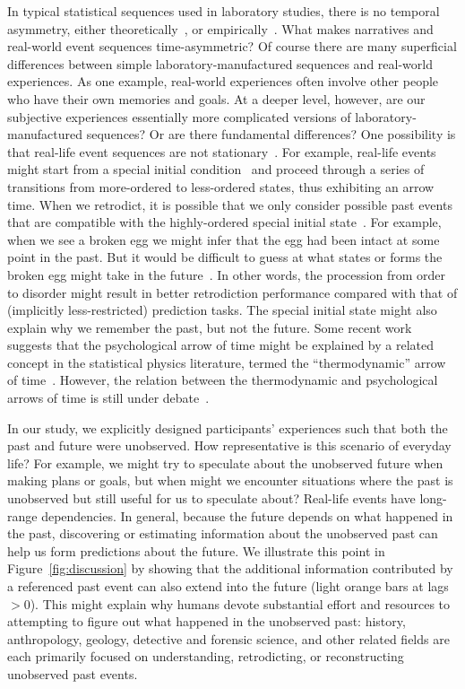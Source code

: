 \documentclass[10pt]{article}
\begin{document}
In typical statistical sequences used in laboratory studies, there is no temporal asymmetry, either theoretically~\citep{Cove94, BialEtal01, ElliEtal09}, or empirically~\citep{JonePash07}. What makes narratives and real-world event sequences time-asymmetric? Of course there are many superficial differences between simple laboratory-manufactured sequences and real-world experiences.  As one example, real-world experiences often involve other people who have their own memories and goals.  At a deeper level, however, are our subjective experiences essentially more complicated versions of laboratory-manufactured sequences?  Or are there fundamental differences?  One possibility is that real-life event sequences are not stationary~\citep[i.e., not in equilibrium,][]{Cove94}. For example, real-life events might start from a special initial condition~\citep{Albe00, Feyn65, Cove94} and proceed through a series of transitions from more-ordered to less-ordered states, thus exhibiting an arrow time. When we retrodict, it is possible that we only consider possible past events that are compatible with the highly-ordered special initial state~\citep{Carr10, Carr16}.  For example, when we see a broken egg we might infer that the egg had been intact at some point in the past.  But it would be difficult to guess at what states or forms the broken egg might take in the future~\citep{Carr10, Carr16}.  In other words, the procession from order to disorder might result in better retrodiction performance compared with that of (implicitly less-restricted) prediction tasks. The special initial state might also explain why we remember the past, but not the future. Some recent work suggests that the psychological arrow of time might be explained by a related concept in the statistical physics literature, termed the ``thermodynamic'' arrow of time~\citep{MlodBrun14, Rove22}. However, the relation between the thermodynamic and psychological arrows of time is still under debate~\citep{Golo21, HemmShen19}. 

In our study, we explicitly designed participants' experiences such that both the past and future were unobserved.  How representative is this scenario of everyday life?  For example, we might try to speculate about the unobserved future when making plans or goals, but when might we encounter situations where the past is unobserved but still useful for us to speculate about?  Real-life events have long-range dependencies.  In general, because the future depends on what happened in the past, discovering or estimating information about the unobserved past can help us form predictions about the future.  We illustrate this point in Figure~\ref{fig:discussion} by showing that the additional information contributed by a referenced past event can also extend into the future (light orange bars at lags $> 0$).  This might explain why humans devote substantial effort and resources to attempting to figure out what happened in the unobserved past: history, anthropology, geology, detective and forensic science, and other related fields are each primarily focused on understanding, retrodicting, or reconstructing unobserved past events.
\end{document}
